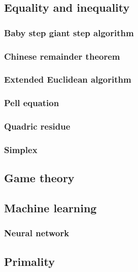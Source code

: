 \documentclass[titlepage,a4paper,10pt]{article}
\begin{document}
\begin{multicols}{2}
\begin{spacing}{0.8}
{			\subsection{Equality and inequality}
				\subsubsection{Baby step giant step algorithm}
					
				\subsubsection{Chinese remainder theorem}
					
				\subsubsection{Extended Euclidean algorithm}
					
				\subsubsection{Pell equation}
					
				\subsubsection{Quadric residue}
					
				\subsubsection{Simplex}
					
			\subsection{Game theory}
				
			\subsection{Machine learning}
				\subsubsection{Neural network}
					
			\subsection{Primality}
}
\end{spacing}
\end{multicols}
\end{document}
